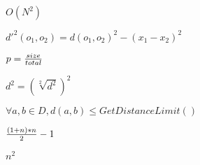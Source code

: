 \documentclass{article}
\begin{document}
$O(N^2)$
\pagebreak

$d'^2(o_1,o_2) = d(o_1,o_2)^2 - (x_1 - x_2)^2$
\pagebreak

$p = {size \over total} $
\pagebreak

$ d^2 = (\sqrt[2]{d^2})^2 $
\pagebreak

$ \forall a,b \in D, d(a,b) \le GetDistanceLimit()$
\pagebreak

$ {{(1 + n) * n} \over {2}} - 1 $
\pagebreak

$ n^2 $
\pagebreak
\end{document}
